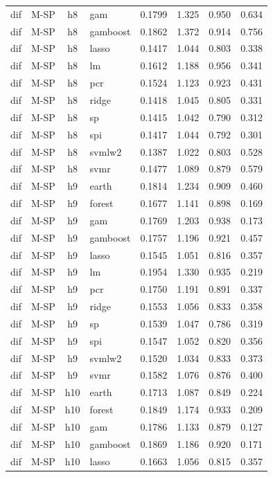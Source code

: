 \begin{ThreePartTable}
\begin{longtable}[t]{llclcccc}
dif & M-SP & h8 & gam & 0.1799 & 1.325 & 0.950 & 0.634\\
dif & M-SP & h8 & gamboost & 0.1862 & 1.372 & 0.914 & 0.756\\
dif & M-SP & h8 & lasso & 0.1417 & 1.044 & 0.803 & 0.338\\
dif & M-SP & h8 & lm & 0.1612 & 1.188 & 0.956 & 0.341\\
dif & M-SP & h8 & pcr & 0.1524 & 1.123 & 0.923 & 0.431\\
dif & M-SP & h8 & ridge & 0.1418 & 1.045 & 0.805 & 0.331\\
dif & M-SP & h8 & sp & 0.1415 & 1.042 & 0.790 & 0.312\\
dif & M-SP & h8 & spi & 0.1417 & 1.044 & 0.792 & 0.301\\
dif & M-SP & h8 & svmlw2 & 0.1387 & 1.022 & 0.803 & 0.528\\
dif & M-SP & h8 & svmr & 0.1477 & 1.089 & 0.879 & 0.579\\
\addlinespace
dif & M-SP & h9 & earth & 0.1814 & 1.234 & 0.909 & 0.460\\
dif & M-SP & h9 & forest & 0.1677 & 1.141 & 0.898 & 0.169\\
dif & M-SP & h9 & gam & 0.1769 & 1.203 & 0.938 & 0.173\\
dif & M-SP & h9 & gamboost & 0.1757 & 1.196 & 0.921 & 0.457\\
dif & M-SP & h9 & lasso & 0.1545 & 1.051 & 0.816 & 0.357\\
dif & M-SP & h9 & lm & 0.1954 & 1.330 & 0.935 & 0.219\\
dif & M-SP & h9 & pcr & 0.1750 & 1.191 & 0.891 & 0.337\\
dif & M-SP & h9 & ridge & 0.1553 & 1.056 & 0.833 & 0.358\\
dif & M-SP & h9 & sp & 0.1539 & 1.047 & 0.786 & 0.319\\
dif & M-SP & h9 & spi & 0.1547 & 1.052 & 0.820 & 0.356\\
dif & M-SP & h9 & svmlw2 & 0.1520 & 1.034 & 0.833 & 0.373\\
dif & M-SP & h9 & svmr & 0.1582 & 1.076 & 0.876 & 0.400\\
\addlinespace
dif & M-SP & h10 & earth & 0.1713 & 1.087 & 0.849 & 0.224\\
dif & M-SP & h10 & forest & 0.1849 & 1.174 & 0.933 & 0.209\\
dif & M-SP & h10 & gam & 0.1786 & 1.133 & 0.879 & 0.127\\
dif & M-SP & h10 & gamboost & 0.1869 & 1.186 & 0.920 & 0.171\\
dif & M-SP & h10 & lasso & 0.1663 & 1.056 & 0.815 & 0.357\\

\end{longtable}
\end{ThreePartTable}
